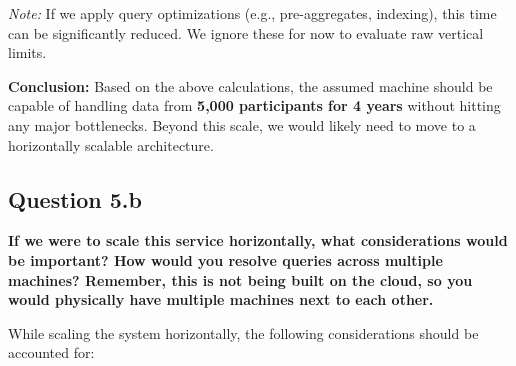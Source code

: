 \documentclass[a4paper, 12pt]{article}
\begin{document}
\vspace{0.75em}

\textit{Note:} If we apply query optimizations (e.g., pre-aggregates, indexing), this time can be significantly reduced. We ignore these for now to evaluate raw vertical limits.

\vspace{0.75em}

\textbf{Conclusion:} Based on the above calculations, the assumed machine should be capable of handling data from \textbf{5,000 participants for 4 years} without hitting any major bottlenecks. Beyond this scale, we would likely need to move to a horizontally scalable architecture.

\subsection*{Question 5.b}
\textbf{If we were to scale this service horizontally, what considerations would be important? How would you resolve queries across multiple machines? Remember, this is not being built on the cloud, so you would physically have multiple machines next to each other.}

While scaling the system horizontally, the following considerations should be accounted for:
\end{document}
